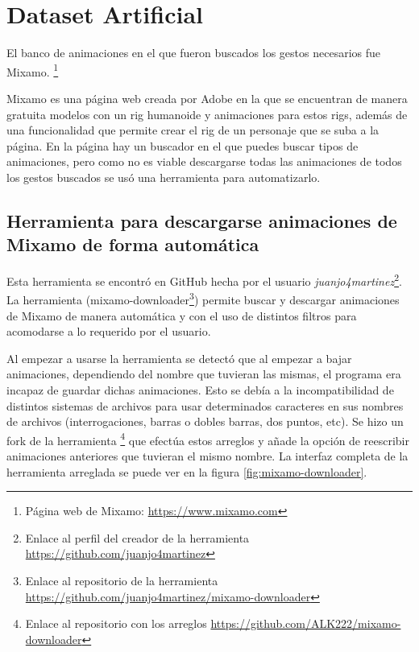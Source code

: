 \section{Dataset Artificial}
\label{sec:datasetArtificial}

El banco de animaciones en el que fueron buscados los gestos necesarios fue Mixamo. \footnote{Página web de Mixamo: \url{https://www.mixamo.com}}

Mixamo es una página web creada por Adobe en la que se encuentran de manera gratuita modelos con un \gls{rig} humanoide y animaciones para estos rigs, además de una funcionalidad que permite crear el \gls{rig} de un personaje que se suba a la página.
En la página hay un buscador en el que puedes buscar tipos de animaciones, pero como no es viable descargarse todas las animaciones de todos los gestos buscados se usó una herramienta para automatizarlo.

\subsection{Herramienta para descargarse animaciones de Mixamo de forma automática}

Esta herramienta se encontró en GitHub hecha por el usuario \textit{juanjo4martinez}\footnote{Enlace al perfil del creador de la herramienta \url{https://github.com/juanjo4martinez}}. La herramienta (mixamo-downloader\footnote{Enlace al repositorio de la herramienta \url{https://github.com/juanjo4martinez/mixamo-downloader}}) permite buscar y descargar animaciones de Mixamo de manera automática y con el uso de distintos filtros para acomodarse a lo requerido por el usuario.

Al empezar a usarse la herramienta se detectó que al empezar a bajar animaciones, dependiendo del nombre que tuvieran las mismas, el programa era incapaz de guardar dichas animaciones. Esto se debía a la incompatibilidad de distintos sistemas de archivos para usar determinados caracteres en sus nombres de archivos (interrogaciones, barras o dobles barras, dos puntos, etc). Se hizo un \gls{fork} de la herramienta \footnote{Enlace al repositorio con los arreglos \url{https://github.com/ALK222/mixamo-downloader}} que efectúa estos arreglos y añade la opción de reescribir animaciones anteriores que tuvieran el mismo nombre. La interfaz completa de la herramienta arreglada se puede ver en la figura \ref{fig:mixamo-downloader}.


